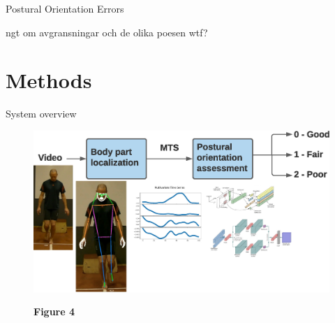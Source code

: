 \begin{frame}[fragile]{Postural Orientation Errors}


\end{frame}

\begin{frame}[fragile]{ngt om avgransningar och de olika poesen}
  wtf?
\end{frame}

\section{Methods}

\begin{frame}[fragile]{System overview}
    \begin{figure}
      \centering
      \includegraphics[width=\textwidth]{files/figs/presentation/sys-overview.eps}

      {\scriptsize\textbf{Figure 4}}
    \end{figure}
\end{frame}

